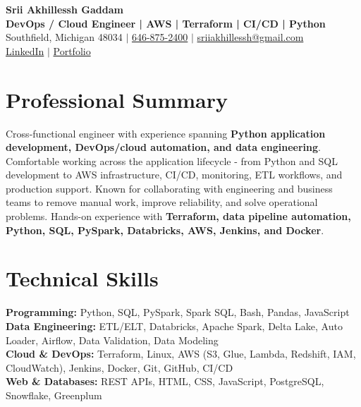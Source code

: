 \documentclass[letterpaper,10pt]{article}
\begin{document}
\fontsize{9.35pt}{10.45pt}\selectfont

\begin{center}
    {\LARGE \textbf{Srii Akhillessh Gaddam}} \\[-1pt]
    \textbf{DevOps / Cloud Engineer | AWS | Terraform | CI/CD | Python} \\[2pt]
    Southfield, Michigan 48034 $|$
    \href{tel:6468752400}{646-875-2400} $|$
    \href{mailto:sriiakhillessh@gmail.com}{sriiakhillessh@gmail.com} \\[1pt]
    \href{https://www.linkedin.com/in/srii-akhiilessh-gaddam-b48668191/}{LinkedIn} $|$
    \href{https://sriiakhillesshg.github.io/portfolio/}{Portfolio}
\end{center}
\vspace{-8pt}

\section{Professional Summary}
\small{Cross-functional engineer with experience spanning \textbf{Python application development, DevOps/cloud automation, and data engineering}. Comfortable working across the application lifecycle - from Python and SQL development to AWS infrastructure, CI/CD, monitoring, ETL workflows, and production support. Known for collaborating with engineering and business teams to remove manual work, improve reliability, and solve operational problems. Hands-on experience with \textbf{Terraform, data pipeline automation, Python, SQL, PySpark, Databricks, AWS, Jenkins, and Docker}.}

\section{Technical Skills}
\small{
\textbf{Programming:} Python, SQL, PySpark, Spark SQL, Bash, Pandas, JavaScript \\
\textbf{Data Engineering:} ETL/ELT, Databricks, Apache Spark, Delta Lake, Auto Loader, Airflow, Data Validation, Data Modeling \\
\textbf{Cloud \& DevOps:} Terraform, Linux, AWS (S3, Glue, Lambda, Redshift, IAM, CloudWatch), Jenkins, Docker, Git, GitHub, CI/CD \\
\textbf{Web \& Databases:} REST APIs, HTML, CSS, JavaScript, PostgreSQL, Snowflake, Greenplum
}
\end{document}
